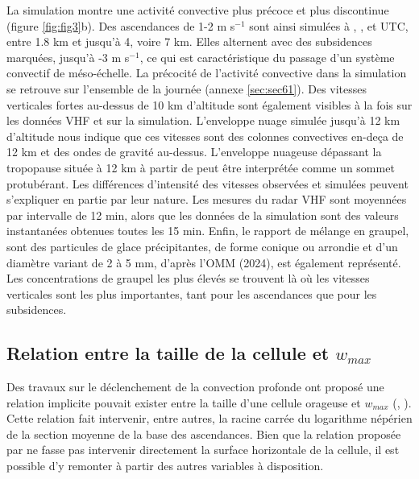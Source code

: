 \documentclass[12pt]{article}
\begin{document}
\begin{multicols}{2}

La simulation montre une activité convective plus précoce et plus discontinue (figure \ref{fig:fig3}b). Des ascendances de 1-2 m s$^{-1}$ sont ainsi simulées à , ,  et  UTC, entre 1.8 km et jusqu’à 4, voire 7 km. Elles alternent avec des subsidences marquées, jusqu’à -3 m s$^{-1}$, ce qui est caractéristique du passage d'un système convectif de méso-échelle. La précocité de l’activité convective dans la simulation se retrouve sur l’ensemble de la journée (annexe \ref{sec:sec61}). %
Des vitesses verticales fortes au-dessus de 10 km d'altitude sont également visibles à la fois sur les données VHF et sur la simulation. L'enveloppe nuage simulée jusqu'à 12 km d'altitude nous indique que ces vitesses sont des colonnes convectives en-deça de 12 km et des ondes de gravité au-dessus. L'enveloppe nuageuse dépassant la tropopause située à 12 km à partir de  peut être interprétée comme un sommet protubérant.
Les différences d’intensité des vitesses observées et simulées peuvent s’expliquer en partie par leur nature. Les mesures du radar VHF sont moyennées par intervalle de 12 min, alors que les données de la simulation sont des valeurs instantanées obtenues toutes les 15 min. Enfin, le rapport de mélange en graupel, sont des particules de glace précipitantes, de forme conique ou arrondie et d'un diamètre variant de 2 à 5 mm, d'après l'OMM (2024), est également représenté. Les concentrations de graupel les plus élevés se trouvent là où les vitesses verticales sont les plus importantes, tant pour les ascendances que pour les subsidences. 

\subsection{Relation entre la taille de la cellule et \texorpdfstring{$w_{max}$}{TEXT}}
\label{subsec:subsec_w_max}

Des travaux sur le déclenchement de la convection profonde ont proposé une relation implicite pouvait exister entre la taille d'une cellule orageuse et $w_{max}$ (\cite{Rochetin_I}, \cite{Rochetin_II}). Cette relation fait intervenir, entre autres, la racine carrée du logarithme népérien de la section moyenne de la base des ascendances. Bien que la relation proposée par \cite{Rochetin_I} ne fasse pas intervenir directement la surface horizontale de la cellule, il est possible d'y remonter à partir des autres variables à disposition. 


\end{multicols}
\end{document}

